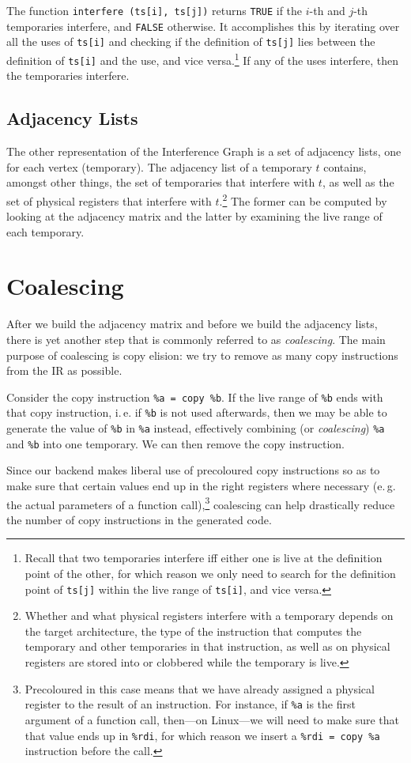 \documentclass[12pt]{report}
\newcommand\ie{i.\,e.}
\newcommand\eg{e.\,g.}
\begin{document}
\noindent The function \verb|interfere (ts[i], ts[j])| returns \verb|TRUE| if the $i$-th and $j$-th temporaries interfere, and \verb|FALSE|
otherwise. It accomplishes this by iterating over all the uses of \verb|ts[i]| and checking if the definition of \verb|ts[j]| lies
between the definition of \verb|ts[i]| and the use, and vice versa.\footnote{Recall that two temporaries interfere iff either one is live
at the definition point of the other, for which reason we only need to search for the definition point of \texttt{ts[j]} within the live
range of \texttt{ts[i]}, and vice versa.} If any of the uses interfere, then the temporaries interfere.

\subsection{Adjacency Lists}
The other representation of the Interference Graph is a set of adjacency lists, one for each vertex (temporary). The adjacency list of a
temporary $t$ contains, amongst other things, the set of temporaries that interfere with $t$, as well as the set of physical registers that
interfere with $t$.\footnote{Whether and what physical registers interfere with a temporary depends on the target architecture, the type of
the instruction that computes the temporary and other temporaries in that instruction, as well as on  physical registers are stored into
or clobbered while the temporary is live.} The former can be computed by looking at the adjacency matrix and the latter by examining the
live range of each temporary.

\section{Coalescing}
After we build the adjacency matrix and before we build the adjacency lists, there is yet another step that is commonly referred to as
\textit{coalescing}. The main purpose of coalescing is copy elision: we try to remove as many copy instructions from the IR as possible.

Consider the copy instruction \verb|%a = copy %b|. If the live range of \verb|%b| ends with that copy instruction, \ie{} if \verb|%b| is not
used afterwards, then we may be able to generate the value of \verb|%b| in \verb|%a| instead, effectively combining (or \textit{coalescing})
\verb|%a| and \verb|%b| into one temporary. We can then remove the copy instruction.

Since our backend makes liberal use of precoloured copy instructions so as to make sure that certain values end up in the right registers
where necessary (\eg{} the actual parameters of a function call),\footnote{Precoloured in this case means that we have already assigned a
physical register to the result of an instruction. For instance, if \texttt{\%a} is the first argument of a function call, then—on Linux—we
will need to make sure that that value ends up in \texttt{\%rdi}, for which reason we insert a \texttt{\%rdi = copy \%a} instruction before
the call.} coalescing can help drastically reduce the number of copy instructions in the generated code.
\end{document}
